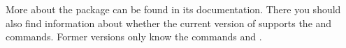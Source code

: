 More about the  package can be found in its
documentation. There you should also find information about whether the
current version of  supports the  and
 commands.  Former versions only know the commands
 and .%
%
\EndIndexGroup
%
\EndIndexGroup
%
\EndIndexGroup



